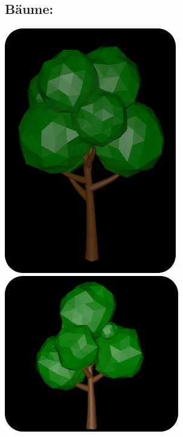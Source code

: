 \documentclass[paper=a4,fontsize=12pt,ngerman]{scrartcl}
\begin{document}
	\subsection*{Bäume:}
	\includegraphics*[scale=0.4]{graphics/Ali1.png}
	\includegraphics*[scale=0.7]{graphics/Ali2.png}\\
\end{document}
